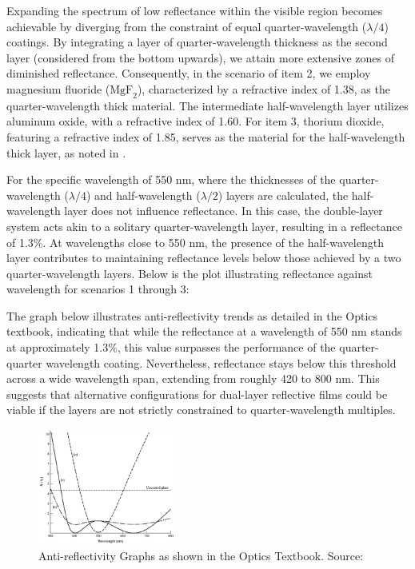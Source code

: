 Expanding the spectrum of low reflectance within the visible region becomes achievable by diverging from the constraint of equal quarter-wavelength ($\lambda/4$) coatings. By integrating a layer of quarter-wavelength thickness as the second layer (considered from the bottom upwards), we attain more extensive zones of diminished reflectance. Consequently, in the scenario of item 2, we employ magnesium fluoride ($\text{MgF}_2$), characterized by a refractive index of 1.38, as the quarter-wavelength thick material. The intermediate half-wavelength layer utilizes aluminum oxide, with a refractive index of 1.60. For item 3, thorium dioxide, featuring a refractive index of 1.85, serves as the material for the half-wavelength thick layer, as noted in \cite{pedrotti_introduction_2007}.

For the specific wavelength of 550 nm, where the thicknesses of the quarter-wavelength ($\lambda/4$) and half-wavelength ($\lambda/2$) layers are calculated, the half-wavelength layer does not influence reflectance. In this case, the double-layer system acts akin to a solitary quarter-wavelength layer, resulting in a reflectance of 1.3\%. At wavelengths close to 550 nm, the presence of the half-wavelength layer contributes to maintaining reflectance levels below those achieved by a two quarter-wavelength layers. Below is the plot illustrating reflectance against wavelength for scenarios 1 through 3:

The graph below illustrates anti-reflectivity trends as detailed in the Optics textbook, indicating that while the reflectance at a wavelength of 550 nm stands at approximately 1.3\%, this value surpasses the performance of the quarter-quarter wavelength coating. Nevertheless, reflectance stays below this threshold across a wide wavelength span, extending from roughly 420 to 800 nm. This suggests that alternative configurations for dual-layer reflective films could be viable if the layers are not strictly constrained to quarter-wavelength multiples.

\begin{figure}[ht!]
  \centering
  \includegraphics[width=0.4\textwidth]{Chapters/Figures/Chapter 4 Figures/Antireflectivity Graphs in the Optics Book.png}
  \caption{Anti-reflectivity Graphs as shown in the Optics Textbook. Source: \cite{pedrotti_introduction_2007}}
  \label{fig:antireflectivity graphs in the Optics book}
\end{figure}

